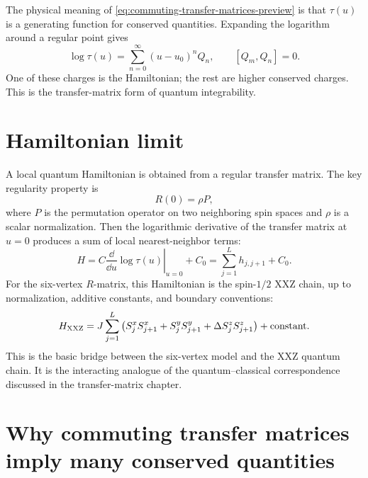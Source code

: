 The physical meaning of \cref{eq:commuting-transfer-matrices-preview} is that
$\tau(u)$ is a generating function for conserved quantities.  Expanding the
logarithm around a regular point gives
\begin{equation}
\label{eq:charges-from-log-transfer-preview}
    \log\tau(u)
    =
    \sum_{n=0}^{\infty} (u-u_0)^n Q_n,
    \qquad
    [Q_m,Q_n]=0 .
\end{equation}
One of these charges is the Hamiltonian; the rest are higher conserved charges.
This is the transfer-matrix form of quantum integrability.

\section{Hamiltonian limit}
\label{sec:hamiltonian-limit-preview}

A local quantum Hamiltonian is obtained from a regular transfer matrix.  The key
regularity property is
\begin{equation}
\label{eq:R-regularity-preview}
    R(0)=\rho P,
\end{equation}
where $P$ is the permutation operator on two neighboring spin spaces and $\rho$ is
a scalar normalization.  Then the logarithmic derivative of the transfer matrix
at $u=0$ produces a sum of local nearest-neighbor terms:
\begin{equation}
\label{eq:hamiltonian-log-transfer-preview}
    H
    =
    C\left.\frac{\dd}{\dd u}\log\tau(u)\right|_{u=0}
    +C_0
    =
    \sum_{j=1}^{L}h_{j,j+1}+C_0 .
\end{equation}
For the six-vertex $R$-matrix, this Hamiltonian is the spin-$1/2$ XXZ chain,
up to normalization, additive constants, and boundary conventions:
\begin{equation}
\label{eq:xxz-from-six-vertex-preview}
    H_{\rm XXZ}
    =
    J\sum_{j=1}^{L}
    \left(
    S_j^xS_{j+1}^x
    +S_j^yS_{j+1}^y
    +\Delta S_j^zS_{j+1}^z
    \right)
    +\text{constant} .
\end{equation}
This is the basic bridge between the six-vertex model and the XXZ quantum chain.
It is the interacting analogue of the quantum--classical correspondence discussed
in the transfer-matrix chapter.

\section{Why commuting transfer matrices imply many conserved quantities}
\label{sec:commuting-transfer-conserved-quantities}

